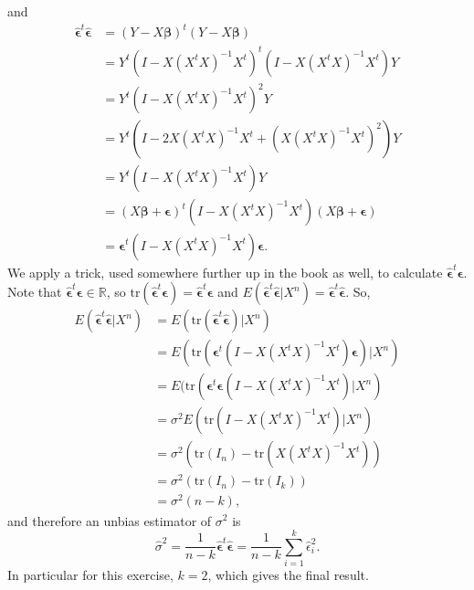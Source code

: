 and
\begin{equation*}
    \begin{split}
        \hat{\bm{\epsilon}}^t\hat{\bm{\epsilon}}
            &= (Y - X\bm{\beta})^t(Y - X\bm{\beta}) \\
            &= Y^t (I - X(X^tX)^{-1}X^t)^t (I - X(X^tX)^{-1}X^t) Y \\
            &= Y^t (I - X(X^tX)^{-1}X^t)^2 Y \\
            &= Y^t (I - 2X(X^tX)^{-1}X^t + (X(X^tX)^{-1}X^t)^2) Y \\
            &= Y^t (I - X(X^tX)^{-1}X^t) Y \\
            &= (X\bm{\beta} + \bm{\epsilon})^t (I - X(X^tX)^{-1}X^t) (X\bm{\beta} + \bm{\epsilon}) \\
            &= \bm{\epsilon}^t (I - X(X^tX)^{-1}X^t) \bm{\epsilon}.
    \end{split}
\end{equation*}
We apply a trick, used somewhere further up in the book as well, to calculate $\hat{\bm{\epsilon}}^t\bm{\epsilon}$.
Note that $\hat{\bm{\epsilon}}^t\bm{\epsilon} \in \mathbb{R}$, so $\mathrm{tr}(\hat{\bm{\epsilon}}^t\bm{\epsilon}) = \hat{\bm{\epsilon}}^t\bm{\epsilon}$ and $E(\hat{\bm{\epsilon}}^t\hat{\bm{\epsilon}}|X^n) = \hat{\bm{\epsilon}}^t\hat{\bm{\epsilon}}$.
So,
\begin{equation*}
    \begin{split}
        E(\hat{\bm{\epsilon}}^t\hat{\bm{\epsilon}}|X^n)
            &= E(\mathrm{tr}(\hat{\bm{\epsilon}}^t\hat{\bm{\epsilon}})|X^n) \\
            &= E(\mathrm{tr}(\bm{\epsilon}^t(I - X(X^tX)^{-1}X^t)\bm{\epsilon})|X^n) \\
            &= E(\mathrm{tr}(\bm{\epsilon}^t\bm{\epsilon}(I - X(X^tX)^{-1}X^t)|X^n) \\
            &= \sigma^2 E(\mathrm{tr}(I - X(X^tX)^{-1}X^t)|X^n) \\
            &= \sigma^2 (\mathrm{tr}(I_n) - \mathrm{tr}(X(X^tX)^{-1}X^t)) \\
            &= \sigma^2 (\mathrm{tr}(I_n) - \mathrm{tr}(I_k)) \\
            &= \sigma^2 (n - k),
    \end{split}
\end{equation*}
and therefore an unbias estimator of $\sigma^2$ is
\begin{equation*}
    \hat{\sigma}^2 = \frac{1}{n - k} \bm{\hat{\epsilon}}^t \bm{\hat{\epsilon}}
        = \frac{1}{n - k} \sum_{i = 1}^k \hat{\epsilon}_i^2.
\end{equation*}
In particular for this exercise, $k = 2$, which gives the final result.


